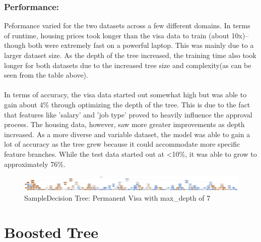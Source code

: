 \documentclass[h]{article}
\begin{document}
\subsubsection*{Performance:}
Peformance varied for the two datasets across a few different domains.  In terms of runtime, housing prices took 
longer than the visa data to train (about 10x)--though both were extremely fast on a powerful laptop.
  This was mainly due to a larger dataset size.  As 
the depth of the tree increased, the training time also took longer for both datasets due to the
increased tree size and complexity(as can be seen from the table above).
\\ \\ 
In terms of accuracy, the visa data started out somewhat high but was able to gain about 4\% through 
optimizing the depth of the tree.  This is due to the fact that features like 
'salary' and 'job type' proved to heavily influence the approval process.  The 
housing data, however, saw more greater improvements as depth increased.    As a 
more diverse and variable dataset, the model was able to gain a lot of accuracy 
as the tree grew because it could accommodate more specific feature branches.  While the test data
started out at \textless 10\%, it was able to grow to approximately 76\%.   

\begin{figure}[H]
    \includegraphics[width=1.0\textwidth,keepaspectratio]{1_dtree.jpg} 
    \caption*{SampleDecision Tree: Permanent Visa with max\_depth of 7} 
\end{figure}

\section*{Boosted Tree}
\end{document}
